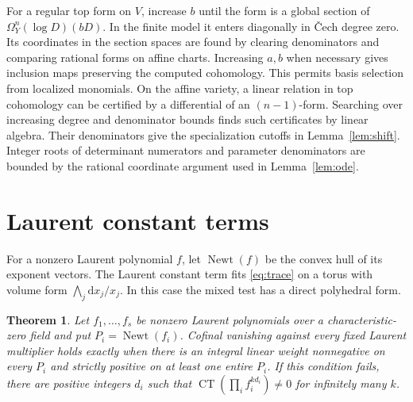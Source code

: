 \documentclass[11pt]{article}
\newtheorem{theorem}{Theorem}
\DeclareMathOperator{\CT}{CT}
\DeclareMathOperator{\Newt}{Newt}
\newcommand{\dd}{\mathrm d}
\begin{document}
For a regular top form on \(V\), increase \(b\) until the form
is a global section of \(\Omega_Y^n(\log D)(bD)\).
In the finite model it enters diagonally in Čech degree zero.
Its coordinates in the section spaces are found by clearing
denominators and comparing rational forms on affine charts.
Increasing \(a,b\) when necessary gives inclusion maps
preserving the computed cohomology. This permits basis selection
from localized monomials. On the affine variety, a linear relation in top cohomology
can be certified by a differential of an \((n-1)\)-form. Searching
over increasing degree and denominator bounds finds such certificates
by linear algebra. Their denominators give the specialization
cutoffs in Lemma~\ref{lem:shift}. Integer roots of determinant
numerators and parameter denominators are bounded by the rational
coordinate argument used in Lemma~\ref{lem:ode}.

\section{Laurent constant terms}\label{sec:laurent}

For a nonzero Laurent polynomial \(f\), let \(\Newt(f)\) be the
convex hull of its exponent vectors. The Laurent constant term
fits \eqref{eq:trace} on a torus with volume form
\(\bigwedge_j \dd x_j/x_j\). In this case the mixed test has
a direct polyhedral form.

\begin{theorem}\label{thm:laurent}
Let \(f_1,\ldots,f_s\) be nonzero Laurent polynomials over a
characteristic-zero field and put \(P_i=\Newt(f_i)\).
Cofinal vanishing against every fixed Laurent multiplier holds
exactly when there is an integral linear weight nonnegative on
every \(P_i\) and strictly positive on at least one entire \(P_i\).
If this condition fails, there are positive integers \(d_i\)
such that \(\CT(\prod_i f_i^{k d_i})\ne0\) for infinitely many \(k\).
\end{theorem}
\end{document}

